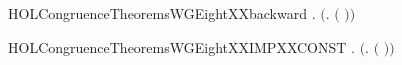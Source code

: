 \newcommand{\HOLCongruenceTheoremsWGSevenXXbackward}{\UseVerbatim{HOLCongruenceTheoremsWGSevenXXbackward}}
\begin{SaveVerbatim}{HOLCongruenceTheoremsWGEightXXbackward}
\HOLTokenTurnstile{} \HOLSymConst{\HOLTokenForall{}} .  \ensuremath{(}\HOLTokenLambda{}.   \ensuremath{(} \ensuremath{)}\ensuremath{)} \HOLSymConst{\HOLTokenImp{}}  
\end{SaveVerbatim}
\newcommand{\HOLCongruenceTheoremsWGEightXXbackward}{\UseVerbatim{HOLCongruenceTheoremsWGEightXXbackward}}
\begin{SaveVerbatim}{HOLCongruenceTheoremsWGEightXXIMPXXCONST}
\HOLTokenTurnstile{} \HOLSymConst{\HOLTokenForall{}} .  \ensuremath{(}\HOLTokenLambda{}.   \ensuremath{(} \ensuremath{)}\ensuremath{)} \HOLSymConst{\HOLTokenImp{}}  
\end{SaveVerbatim}
\newcommand{\HOLCongruenceTheoremsWGEightXXIMPXXCONST}{\UseVerbatim{HOLCongruenceTheoremsWGEightXXIMPXXCONST}}
